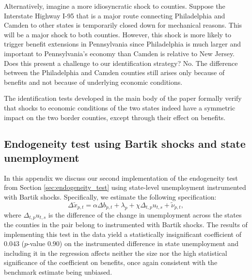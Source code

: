 \documentclass[12pt]{article}
\newcommand{\1}{\mathbf{1}}
\begin{document}
\begin{appendix}
Alternatively, imagine a more idiosyncratic shock to counties. Suppose the Interstate Highway I-95 that is a major route connecting Philadelphia and Camden to other states is temporarily closed down for mechanical reasons. This will be a major shock to both counties. However, this shock is more likely to trigger benefit extensions in Pennsylvania since Philadelphia is much larger and important to Pennsylvania's economy than Camden is relative to New Jersey. Does this present a challenge to our identification strategy? No. The difference between the Philadelphia and Camden counties still arises only because of benefits and not because of underlying economic conditions.

The identification tests developed in the main body of the paper formally verify that shocks to economic conditions of the two states indeed have a symmetric impact on the two border counties, except through their effect on benefits.

\subsection{Endogeneity test using Bartik shocks and state unemployment}
\label{app:endogeneity_test_unemp}

In this appendix we discuss our second implementation of the endogeneity test from Section \ref{sec:endogeneity_test} using state-level unemployment instrumented with Bartik shocks. Specifically, we estimate the following specification:
\begin{equation} \label{eq:endogenousFE_Bartik}
\Delta \tilde{x}_{p,t} =  \alpha \Delta b_{p,t} +\lambda_{p} + \chi \Delta_{t,p} u_{t,s}  + \tilde{\nu}_{p,t},
\end{equation}
where $\Delta_{t,p} u_{t,s} $ is the difference of the change in unemployment across the states the counties in the pair belong to instrumented with Bartik shocks. The results of implementing this test in the data yield a statistically insignificant coefficient of $0.043$ ($p$-value $0.90$) on the instrumented difference in state unemployment and including it in the regression affects neither the size nor the high statistical significance of the coefficient on benefits, once again consistent with the benchmark estimate being unbiased.


\end{appendix}
\end{document}
